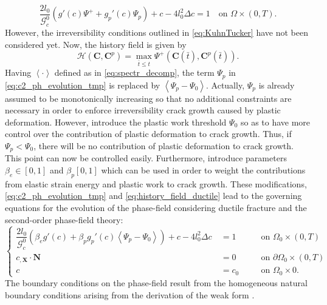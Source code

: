 \begin{equation} \label{eq:c2_ph_evolution_tmp}
\dfrac{2l_{0}}{\mathcal{G}_{c}^{0}}\left(g'\left(c\right)\Psi^{+}+g_{p}'\left(c\right)\Psi_{p}\right) + c - 4l_{0}^{2}\Delta c = 1 \quad\text{on } \Omega\times\left(0,T\right).
\end{equation}
However, the irreversibility conditions outlined in \eqref{eq:KuhnTucker} have not been considered yet. Now, the history field is given by
\begin{equation} \label{eq:history_field_ductile}
	\mathcal{H}\left(\mathbf{C},\mathbf{C}^{p}\right) = \max\limits_{\bar{t}\leq t} \Psi^{+}\left(\mathbf{C}\left(\bar{t}\right),\mathbf{C}^{p}\left(\bar{t}\right)\right).
\end{equation}
Having $\left<\cdot\right>$ defined as in \eqref{eq:spectr_decomp}, the term $\Psi_{p}$ in \eqref{eq:c2_ph_evolution_tmp} is replaced by $\left<\Psi_{p}-\Psi_{0}\right>$. Actually, $\Psi_{p}$ is already assumed to be monotonically increasing so that no additional constraints are necessary in order to enforce irreversibility crack growth caused by plastic deformation. However, \citet{03_PF_ductile} introduce the plastic work threshold $\Psi_{0}$ so as to have more control over the contribution of plastic deformation to crack growth. Thus, if $\Psi_{p}<\Psi_{0}$, there will be no contribution of plastic deformation to crack growth. This point can now be controlled easily. Furthermore, \citet{03_PF_ductile} introduce parameters $\beta_{e}\in\left[0,1\right]$ and $\beta_{p}\left[0,1\right]$ which can be used in order to weight the contributions from elastic strain energy and plastic work to crack growth. These modifications, \eqref{eq:c2_ph_evolution_tmp} and \eqref{eq:history_field_ductile} lead to the governing equations for the evolution of the phase-field considering ductile fracture and the second-order phase-field theory:
\begin{equation} \label{eq:c2_equil_ductile}
	\left\{\begin{alignedat}{2}
		\dfrac{2l_{0}}{\mathcal{G}_{c}^{0}}\left(\beta_{e}g'\left(c\right)+\beta_{p}g_{p}'\left(c\right)\left<\Psi_{p}-\Psi_{0}\right>\right) + c - 4l_{0}^{2}\Delta c\ &= 1 && \quad\text{on } \Omega_{0}\times\left(0,T\right) \\
		c_{,\mathbf{X}}\cdot\mathbf{N} &= 0 && \quad \text{on } \partial\Omega_{0}\times\left(0,T\right) \\
		c &= c_{0} && \quad \text{on } \Omega_{0}\times0.
	\end{alignedat}\right.
\end{equation}
The boundary conditions on the phase-field result from the homogeneous natural boundary conditions arising from the derivation of the weak form \citep{11_PF_DissBorden}.

